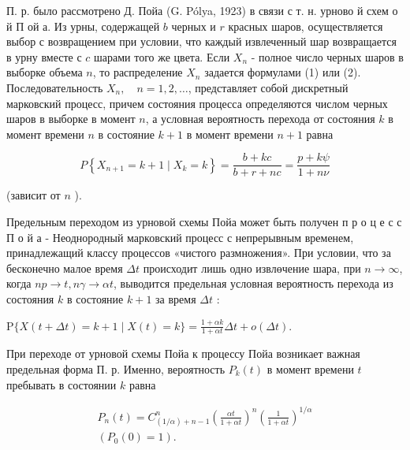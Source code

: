\documentclass[10pt]{article}
\begin{document}
П. р. было рассмотрено Д. Пойа (G. Pólya, 1923) в связи с т. н. урново й схем о й П ой а. Из урны, содержащей $b$ черных и $r$ красных шаров, осуществляется выбор с возвращением при условии, что каждый извлеченный шар возвращается в урну вместе с $c$ шарами того же цвета. Если $X_{n}$ - полное число черных шаров в выборке объема $n$, то распределение $X_{n}$ задается формулами (1) или (2). Последовательность $X_{n}, \quad n=1,2, \ldots$, представляет собой дискретный марковский процесс, причем состояния процесса определяются числом черных шаров в выборке в момент $n$, а условная вероятность перехода от состояния $k$ в момент времени $n$ в состояние $k+1$ в момент времени $n+1$ равна



\[

P\left\{X_{n+1}=k+1 \mid X_{k}=k\right\}=\frac{b+k c}{b+r+n c}=\frac{p+k \psi}{1+n \nu}

\]



(зависит от $n$ ).



Предельным переходом из урновой схемы Пойа может быть получен п р о ц е с с П о й а - Неоднородный марковский процесс с непрерывным временем, принадлежащий классу процессов «чистого размножения». При условии, что за бесконечно малое время $\Delta t$ происходит лишь одно извлөчение шара, при $n \rightarrow \infty$, когда $n p \rightarrow t, n \gamma \rightarrow \alpha t$, выводится предельная условная вероятность перехода из состояния $k$ в состояние $k+1$ за время $\Delta t$ :



$\mathrm{P}\{X(t+\Delta t)=k+1 \mid X(t)=k\}=\frac{1+\alpha k}{1+\alpha t} \Delta t+o(\Delta t)$.



При переходе от урновой схемы Пойа к процессу Пойа возникает важная предельная форма П. р. Именно, вероятность $P_{k}(t)$ в момент времени $t$ пребывать в состоянии $k$ равна



\[

\begin{gathered}

P_{n}(t)=C_{(1 / \alpha)+n-1}^{n}\left(\frac{\alpha t}{1+\alpha t}\right)^{n}\left(\frac{1}{1+\alpha t}\right)^{1 / \alpha} \\

\left(P_{0}(0)=1\right) .

\end{gathered}

\]
\end{document}
